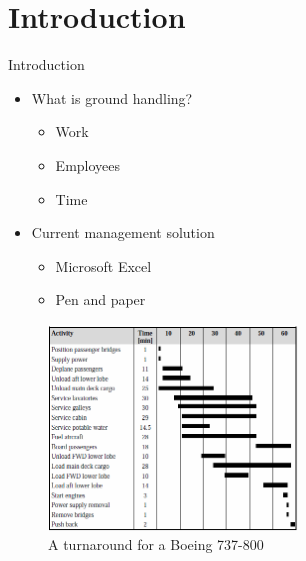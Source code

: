 \section{Introduction}
\begin{frame}{Introduction}{}
	\begin{itemize}
		\item What is ground handling?
		\begin{itemize}
			\item Work
			\item Employees
			\item Time
		\end{itemize}
		\item Current management solution
		\begin{itemize}
			\item Microsoft Excel
			\item Pen and paper
		\end{itemize}
	\end{itemize}
\end{frame}

\begin{frame}
	\begin{figure}[H]
		\centering
		\includegraphics[width=250px]{Grafik/timetable}
		\caption{\footnotesize A turnaround for a Boeing 737-800}
\end{figure}
\end{frame}